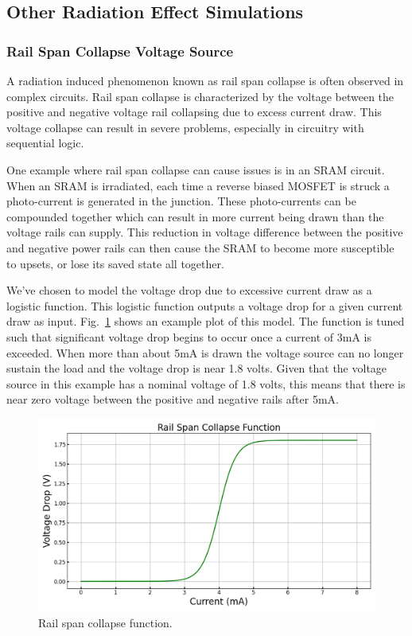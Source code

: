 \documentclass[conference]{IEEEtran}
\begin{document}
    \subsection{Other Radiation Effect Simulations}
    \label{subsec:other-radiation-effect-simulations}

    \subsubsection{Rail Span Collapse Voltage Source}
    A radiation induced phenomenon known as rail span collapse is often observed in complex circuits.
    Rail span collapse is characterized by the voltage between the positive and negative voltage rail collapsing due to excess current draw.
    This voltage collapse can result in severe problems, especially in circuitry with sequential logic.

    One example where rail span collapse can cause issues is in an SRAM circuit.
    When an SRAM is irradiated, each time a reverse biased MOSFET is struck a photo-current is generated in the junction.
    These photo-currents can be compounded together which can result in more current being drawn than the voltage rails can supply.
    This reduction in voltage difference between the positive and negative power rails can then cause the SRAM to become more susceptible to upsets, or lose its saved state all together.

    We've chosen to model the voltage drop due to excessive current draw as a logistic function.
    This logistic function outputs a voltage drop for a given current draw as input.
    Fig.~\ref{fig:rail_collapse_function} shows an example plot of this model.
    The function is tuned such that significant voltage drop begins to occur once a current of 3mA is exceeded.
    When more than about 5mA is drawn the voltage source can no longer sustain the load and the voltage drop is near 1.8 volts.
    Given that the voltage source in this example has a nominal voltage of 1.8 volts, this means that there is near zero voltage between the positive and negative rails after 5mA\@.

    \begin{figure}[htbp]
        \centering
        \includegraphics[width=0.95\linewidth]{rail_collapse_function}
        \caption{Rail span collapse function.}
        \label{fig:rail_collapse_function}
    \end{figure}
\end{document}
